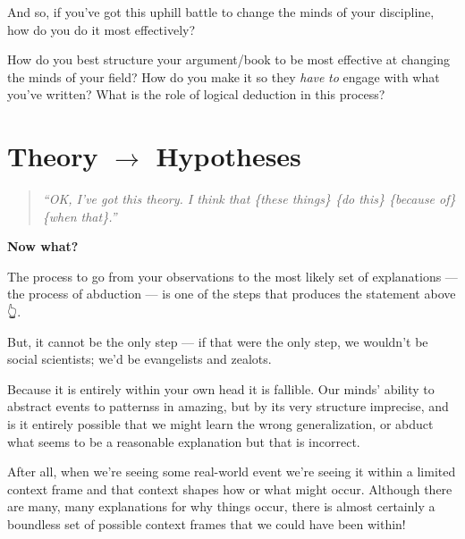 \documentclass[
  letterpaper,
  DIV=11,
  numbers=noendperiod]{scrreprt}
\begin{document}
And so, if you've got this uphill battle to change the minds of your
discipline, how do you do it most effectively?

\begin{tcolorbox}[enhanced jigsaw, titlerule=0mm, colback=white, toptitle=1mm, toprule=.15mm, bottomtitle=1mm, colframe=quarto-callout-note-color-frame, colbacktitle=quarto-callout-note-color!10!white, bottomrule=.15mm, leftrule=.75mm, opacityback=0, title=\textcolor{quarto-callout-note-color}{\faInfo}\hspace{0.5em}{Changing Minds: Part 1}, opacitybacktitle=0.6, arc=.35mm, rightrule=.15mm, breakable, coltitle=black, left=2mm]

How do you best structure your argument/book to be most effective at
changing the minds of your field? How do you make it so they \emph{have}
\emph{to} engage with what you've written? What is the role of logical
deduction in this process?

\end{tcolorbox}

\section{\texorpdfstring{Theory \(\rightarrow\)
Hypotheses}{Theory \textbackslash rightarrow Hypotheses}}\label{theory-rightarrow-hypotheses}

\begin{quote}
\emph{``OK, I've got this theory. I think that \{these things\} \{do
this\} \{because of\} \{when that\}.''}
\end{quote}

\textbf{Now what?}

The process to go from your observations to the most likely set of
explanations --- the process of abduction --- is one of the steps that
produces the statement above 👆.

But, it cannot be the only step --- if that were the only step, we
wouldn't be social scientists; we'd be evangelists and zealots.

Because it is entirely within your own head it is fallible. Our minds'
ability to abstract events to patternss in amazing, but by its very
structure imprecise, and is it entirely possible that we might learn the
wrong generalization, or abduct what seems to be a reasonable
explanation but that is incorrect.

After all, when we're seeing some real-world event we're seeing it
within a limited context frame and that context shapes how or what might
occur. Although there are many, many explanations for why things occur,
there is almost certainly a boundless set of possible context frames
that we could have been within!
\end{document}
